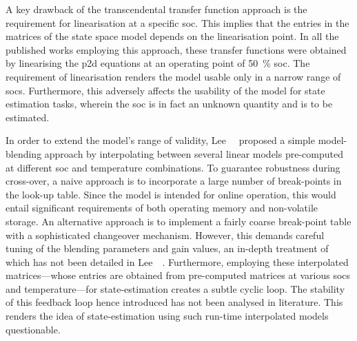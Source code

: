 A  key  drawback  of  the  transcendental  transfer  function  approach  is  the
requirement for  linearisation at  a specific \gls{soc}.  This implies  that the
entries in  the matrices of the  state space model depends  on the linearisation
point.  In all  the  published  works employing  this  approach, these  transfer
functions were obtained  by linearising the \gls{p2d} equations  at an operating
point of  \SI{50}{\percent} \gls{soc}. The requirement  of linearisation renders
the  model usable  only  in  a narrow  range  of  \gls{soc}s. Furthermore,  this
adversely affects the usability of the model for state estimation tasks, wherein
the \gls{soc} is in fact an unknown quantity and is to be estimated.


In order  to extend  the model's  range of  validity, Lee~\etal{}~\cite{Lee2014}
proposed  a  simple model-blending  approach  by  interpolating between  several
linear models pre-computed at  different \gls{soc} and temperature combinations.
To guarantee robustness during cross-over, a  naive approach is to incorporate a
large  number  of  break-points  in  the  look-up  table.  Since  the  model  is
intended  for  online  operation,  this would  entail  significant  requirements
of  both operating  memory  and non-volatile  storage.  An alternative  approach
is  to  implement  a  fairly  coarse  break-point  table  with  a  sophisticated
changeover  mechanism. However,  this  demands careful  tuning  of the  blending
parameters  and  gain values,  an  in-depth  treatment  of  which has  not  been
detailed in Lee~\etal~\cite{Lee2014}.  Furthermore, employing these interpolated
matrices---whose  entries are  obtained  from pre-computed  matrices at  various
\gls{soc}s and temperature---for state-estimation  creates a subtle cyclic loop.
The stability  of this feedback loop  hence introduced has not  been analysed in
literature.  This  renders the  idea  of  state-estimation using  such  run-time
interpolated models  questionable.


